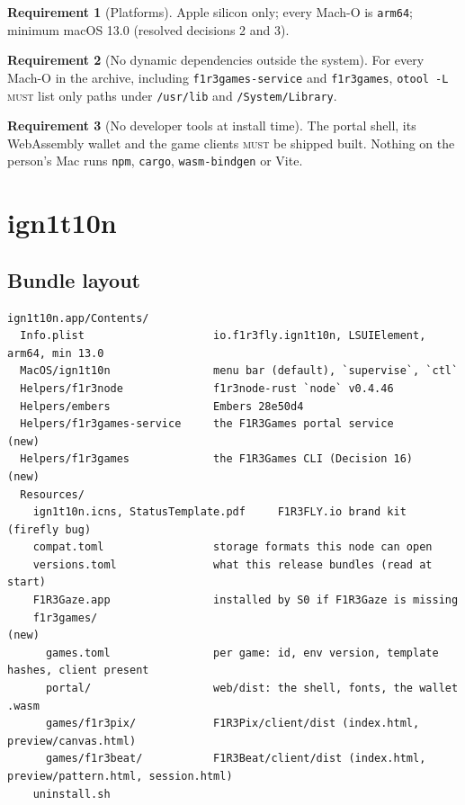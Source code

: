 \documentclass[11pt]{article}
\theoremstyle{definition}
\newtheorem{requirement}{Requirement}
\theoremstyle{remark}
\newcommand{\MUST}{\textsc{must}}
\newcommand{\code}[1]{\texttt{#1}}
\newcommand{\Hr}{ign1t10n}
\begin{document}
\begin{requirement}[Platforms]
Apple silicon only; every Mach-O is \code{arm64}; minimum macOS 13.0 (resolved
decisions 2 and 3).
\end{requirement}

\begin{requirement}[No dynamic dependencies outside the system]
For every Mach-O in the archive, including \code{f1r3games-service} and
\code{f1r3games}, \code{otool -L} \MUST{} list only paths under \code{/usr/lib} and
\code{/System/Library}.
\end{requirement}

\begin{requirement}[No developer tools at install time]
The portal shell, its WebAssembly wallet and the game clients \MUST{} be shipped
built. Nothing on the person's Mac runs \code{npm}, \code{cargo},
\code{wasm-bindgen} or Vite.
\end{requirement}

\section{\Hr{}}\label{sec:ign}

\subsection{Bundle layout}

\begin{lstlisting}
ign1t10n.app/Contents/
  Info.plist                    io.f1r3fly.ign1t10n, LSUIElement, arm64, min 13.0
  MacOS/ign1t10n                menu bar (default), `supervise`, `ctl`
  Helpers/f1r3node              f1r3node-rust `node` v0.4.46
  Helpers/embers                Embers 28e50d4
  Helpers/f1r3games-service     the F1R3Games portal service          (new)
  Helpers/f1r3games             the F1R3Games CLI (Decision 16)        (new)
  Resources/
    ign1t10n.icns, StatusTemplate.pdf     F1R3FLY.io brand kit (firefly bug)
    compat.toml                 storage formats this node can open
    versions.toml               what this release bundles (read at start)
    F1R3Gaze.app                installed by S0 if F1R3Gaze is missing
    f1r3games/                                                           (new)
      games.toml                per game: id, env version, template hashes, client present
      portal/                   web/dist: the shell, fonts, the wallet .wasm
      games/f1r3pix/            F1R3Pix/client/dist (index.html, preview/canvas.html)
      games/f1r3beat/           F1R3Beat/client/dist (index.html, preview/pattern.html, session.html)
    uninstall.sh
\end{lstlisting}
\end{document}
